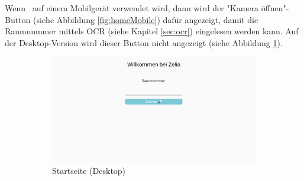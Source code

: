 Wenn \ZELIA\ auf einem Mobilgerät verwendet wird, dann wird der "Kamera öffnen"-Button (siehe Abbildung \ref{fig:homeMobile}) dafür angezeigt, damit die Raumnummer mittels OCR (siehe Kapitel \ref{sec:ocr}) eingelesen werden kann. Auf der Desktop-Version wird dieser Button nicht angezeigt (siehe Abbildung \ref{fig:homeDesktop}).

\begin{figure}[H]
    \begin{subfigure}[c]{0.65\textwidth}
        \centering
        \includegraphics[width=\textwidth]{media/ResponsiveDesign/ZeliaHome.png}
        \caption{Startseite (Desktop)}
        \label{fig:homeDesktop}
    \end{subfigure} \hfill
    \begin{subfigure}[c]{0.35\textwidth}
        \centering

\end{subfigure}
\end{figure}
